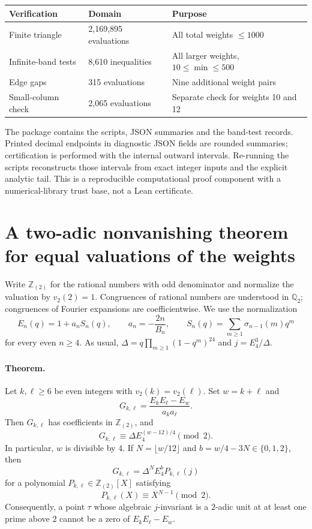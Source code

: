 \documentclass[11pt]{article}
\begin{document}
\begin{center}
\begin{tabular}{@{}lll@{}}
\toprule
Verification & Domain & Purpose\\
\midrule
Finite triangle & 2,169,895 evaluations & All total weights $\le1000$\\
Infinite-band tests & 8,610 inequalities & All larger weights, $10\le\min\le500$\\
Edge gaps & 315 evaluations & Nine additional weight pairs\\
Small-column check & 2,065 evaluations & Separate check for weights 10 and 12\\
\bottomrule
\end{tabular}
\end{center}
The package contains the scripts, JSON summaries and the band-test records. Printed decimal endpoints in diagnostic JSON fields are rounded summaries; certification is performed with the internal outward intervals. Re-running the scripts reconstructs those intervals from exact integer inputs and the explicit analytic tail. This is a reproducible computational proof component with a numerical-library trust base, not a Lean certificate.

\section{A two-adic nonvanishing theorem for equal valuations of the weights}
\label{sec:two-adic-equal-valuations}

Write $\mathbb Z_{(2)}$ for the rational numbers with odd denominator and
normalize the valuation by $v_2(2)=1$.  Congruences of rational numbers
are understood in $\mathbb Q_2$; congruences of Fourier expansions are
coefficientwise.  We use the normalization
\[
 E_n(q)=1+a_nS_n(q),\qquad
 a_n=-\frac{2n}{B_n},\qquad
 S_n(q)=\sum_{m\ge1}\sigma_{n-1}(m)q^m
\]
for every even $n\ge4$.  As usual,
$\Delta=q\prod_{m\ge1}(1-q^m)^{24}$ and $j=E_4^3/\Delta$.

\paragraph{Theorem.}
Let $k,\ell\ge6$ be even integers with
$v_2(k)=v_2(\ell)$.  Set $w=k+\ell$ and
\[
 G_{k,\ell}=\frac{E_kE_\ell-E_w}{a_ka_\ell}.
\]
Then $G_{k,\ell}$ has coefficients in $\mathbb Z_{(2)}$, and
\begin{equation}
 G_{k,\ell}\equiv
 \Delta E_4^{(w-12)/4}\pmod2.
 \label{eq:equal-v-two-congruence}
\end{equation}
In particular, $w$ is divisible by $4$.  If
$N=\lfloor w/12\rfloor$ and $b=w/4-3N\in\{0,1,2\}$, then
\[
 G_{k,\ell}=\Delta^NE_4^bP_{k,\ell}(j)
\]
for a polynomial $P_{k,\ell}\in\mathbb Z_{(2)}[X]$ satisfying
\begin{equation}
 P_{k,\ell}(X)\equiv X^{N-1}\pmod2.
 \label{eq:equal-v-two-j-polynomial}
\end{equation}
Consequently, a point $\tau$ whose algebraic $j$-invariant is a
$2$-adic unit at at least one prime above $2$ cannot be a zero of
$E_kE_\ell-E_w$.
\end{document}

